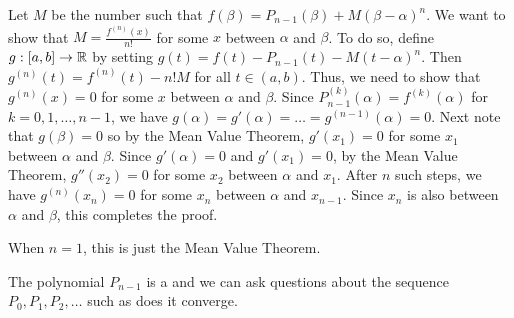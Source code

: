 \documentclass{mathnotes}
\begin{document}
\begin{pf}
  Let $M$ be the number such that $f(\beta)=P_{n-1}(\beta)+M(\beta-\alpha)^n$.
  We want to show that $M=\frac{f^{(n)}(x)}{n!}$ for some $x$ between $\alpha$
  and $\beta$. To do so, define $g:[a,b]\to\mathbb{R}$ by setting
  $g(t)=f(t)-P_{n-1}(t)-M(t-\alpha)^n$. Then $g^{(n)}(t)=f^{(n)}(t)-n!M$ for
  all $t\in(a,b)$. Thus, we need to show that $g^{(n)}(x)=0$ for some $x$
  between $\alpha$ and $\beta$. Since $P_{n-1}^{(k)}(\alpha)=f^{(k)}(\alpha)$
  for $k=0,1,\ldots,n-1$, we have
  $g(\alpha)=g'(\alpha)=\ldots=g^{(n-1)}(\alpha)=0$. Next note that
  $g(\beta)=0$ so by the Mean Value Theorem, $g'(x_1)=0$ for some $x_1$ between
  $\alpha$ and $\beta$. Since $g'(\alpha)=0$ and $g'(x_1)=0$, by the Mean Value
  Theorem, $g''(x_2)=0$ for some $x_2$ between $\alpha$ and $x_1$. After $n$
  such steps, we have $g^{(n)}(x_n)=0$ for some $x_n$ between $\alpha$ and
  $x_{n-1}$. Since $x_n$ is also between $\alpha$ and $\beta$, this completes
  the proof.
\end{pf}

\begin{note}
  When $n=1$, this is just the Mean Value Theorem.
\end{note}

\begin{note}
  The polynomial $P_{n-1}$ is a  and we can ask
  questions about the sequence $P_0,P_1,P_2,\ldots$ such as does it converge.
\end{note}
\end{document}
